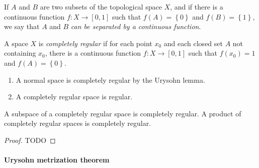 \begin{definition}
  If \( A \) and \( B \) are two subsets of the topological space \( X \), and if there is a continuous function \( f: X \to [0, 1] \) such that \( f(A) = \left\lbrace 0 \right\rbrace \) and \( f(B) = \left\lbrace 1 \right\rbrace \), we say that \( A \) and \( B \) \emph{can be separated by a continuous function}.
\end{definition}

\begin{definition}
  A space \( X \) is \emph{completely regular} if for each point \( x_0 \) and each closed set \( A \) not containing \( x_0 \), there is a continuous function \( f: X \to [0, 1] \) such that \( f(x_0) = 1 \) and \( f(A) = \left\lbrace 0 \right\rbrace \).
\end{definition}
\begin{remark}
  \begin{enumerate}
    \item A normal space is completely regular by the Urysohn lemma.
    \item A completely regular space is regular.
  \end{enumerate}
\end{remark}

\begin{theorem}
  A subspace of a completely regular space is completely regular.
  A product of completely regular spaces is completely regular.
\end{theorem}
\begin{proof}
  TODO %
\end{proof}

\paragraph{Urysohn metrization theorem}

